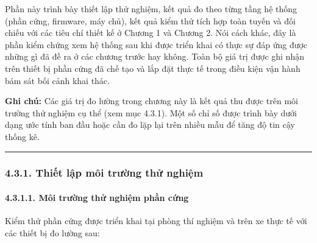\documentclass[a4paper]{extarticle}
\begin{document}
Phần này trình bày thiết lập thử nghiệm, kết quả đo theo từng tầng hệ
thống (phần cứng, firmware, máy chủ), kết quả kiểm thử tích hợp toàn tuyến
và đối chiếu với các tiêu chí thiết kế ở Chương 1 và Chương 2. Nói cách
khác, đây là phần kiểm chứng xem hệ thống sau khi được triển khai có
thực sự đáp ứng được những gì đã đề ra ở các chương trước hay không.
Toàn bộ giá trị được ghi nhận trên thiết bị phần cứng đã chế tạo và lắp
đặt thực tế trong điều kiện vận hành bám sát bối cảnh khai thác.

\textbf{Ghi chú:} Các giá trị đo lường trong chương này là kết quả thu
được trên môi trường thử nghiệm cụ thể (xem mục 4.3.1). Một số chỉ số
được trình bày dưới dạng ước tính ban đầu hoặc cần đo lặp lại trên nhiều
mẫu để tăng độ tin cậy thống kê.

\begin{center}\rule{0.5\linewidth}{0.5pt}\end{center}

\subsubsection{4.3.1. Thiết lập môi trường thử
nghiệm}\label{431-thiux1ebft-lux1eadp-muxf4i-trux1b0ux1eddng-thux1eed-nghiux1ec7m}

\paragraph{4.3.1.1. Môi trường thử nghiệm phần
cứng}\label{4311-muxf4i-trux1b0ux1eddng-thux1eed-nghiux1ec7m-phux1ea7n-cux1ee9ng}

Kiểm thử phần cứng được triển khai tại phòng thí nghiệm và trên xe thực
tế với các thiết bị đo lường sau:
\end{document}

